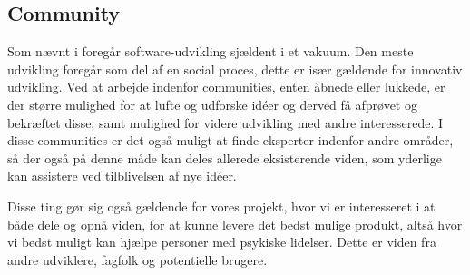 \subsection{Community}
Som nævnt i \citet[Kapitel 2]{book:softwareinnovation} foregår software-udvikling sjældent i et vakuum.
Den meste udvikling foregår som del af en social proces, dette er især gældende for innovativ udvikling.
Ved at arbejde indenfor communities, enten åbnede eller lukkede, er der større mulighed for at lufte og udforske idéer og derved få afprøvet og bekræftet disse, samt mulighed for videre udvikling med andre interesserede.
I disse communities er det også muligt at finde eksperter indenfor andre områder, så der også på denne måde kan deles allerede eksisterende viden, som yderlige kan assistere ved tilblivelsen af nye idéer.

Disse ting gør sig også gældende for vores projekt, hvor vi er interesseret i at både dele og opnå viden, for at kunne levere det bedst mulige produkt, altså hvor vi bedst muligt kan hjælpe personer med psykiske lidelser.
Dette er viden fra andre udviklere, fagfolk og potentielle brugere.

